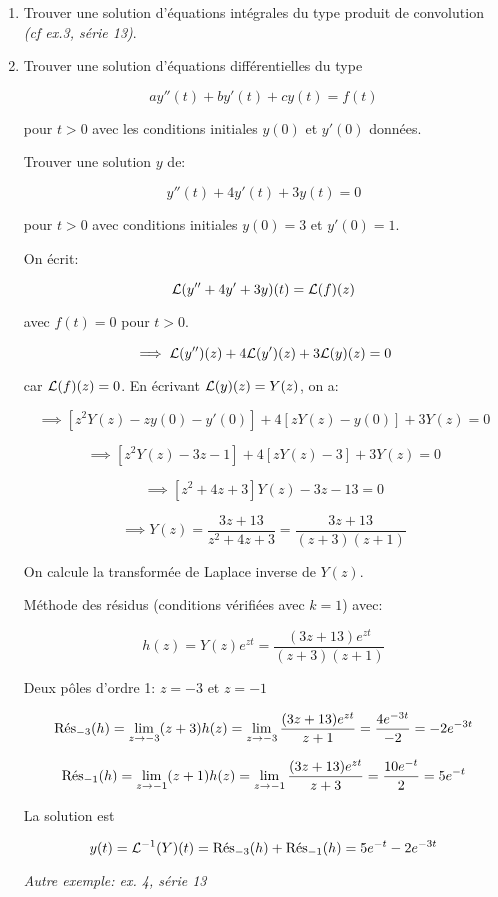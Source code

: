 \begin{enumerate}[label=\alph{enumi})]
    \item 
    Trouver une solution d'équations intégrales du type produit de convolution \textit{(cf ex.3, série 13)}.
    
    \item 
    Trouver une solution d'équations différentielles du type
    
    \[ a y''(t) + b y'(t) + c y(t) = f(t) \]
    
    pour $t > 0$ avec les conditions initiales $y(0)$ et $y'(0)$ données.
    
    \begin{example}
        Trouver une solution $y$ de:
        
        \[ y''(t) + 4 y'(t) + 3 y(t) = 0 \]
        
        pour $t > 0$ avec conditions initiales $y(0) = 3$ et $y'(0) = 1$.
        
        On écrit:
        
        \[ \TL(y'' + 4 y' + 3 y)(t) = \TL(f)(z) \]
        
        avec $f(t) = 0$ pour $t > 0$.
        
        \[ \implies \TL(y'')(z) + 4 \TL(y')(z) + 3 \TL(y)(z) = 0 \]
        
        car $\TL(f)(z) = 0$.
        En écrivant $\TL(y)(z) = Y(z)$, on a:
        
        \[ \implies \left[ z^2 Y(z) - z y(0) - y'(0) \right] + 4 \left[ z Y(z) - y(0) \right] + 3 Y(z) = 0 \]
        
        \[ \implies \left[ z^2 Y(z) - 3z - 1 \right] + 4 \left[ z Y(z) - 3 \right] + 3 Y(z) = 0 \]
        
        \[ \implies \left[ z^2 + 4z + 3 \right] Y(z) - 3z - 13 = 0 \]
        
        \[ \implies Y(z) = \frac{3z + 13}{z^2 + 4z + 3} = \frac{3z + 13}{(z+3)(z+1)} \]
        
        On calcule la transformée de Laplace inverse de $Y(z)$.
        
        Méthode des résidus (conditions vérifiées avec $k = 1$) avec:
        
        \[ h(z) = Y(z) e^{zt} = \frac{(3z + 13)e^{zt}}{(z+3)(z+1)} \]
        
        Deux pôles d'ordre 1: $z = -3$ et $z = -1$
        
        \[ \Res_{-3}(h) = \lim_{z \rightarrow -3} (z + 3)h(z)
        = \lim_{z \rightarrow -3} \frac{(3z + 13)e^{zt}}{z+1}
        = \frac{4 e^{-3t}}{-2} = -2 e^{-3t} \]
        
        \[ \Res_{-1}(h) = \lim_{z \rightarrow -1} (z + 1)h(z)
        = \lim_{z \rightarrow -1} \frac{(3z + 13)e^{zt}}{z+3}
        = \frac{10 e^{-t}}{2} = 5 e^{-t} \]
        
        La solution est
        
        \[ y(t) = \TLi(Y)(t) = \Res_{-3}(h) + \Res_{-1}(h) = 5 e^{-t} - 2 e^{-3t} \]
        
        \textit{Autre exemple: ex. 4, série 13}
    \end{example}
\end{enumerate}

